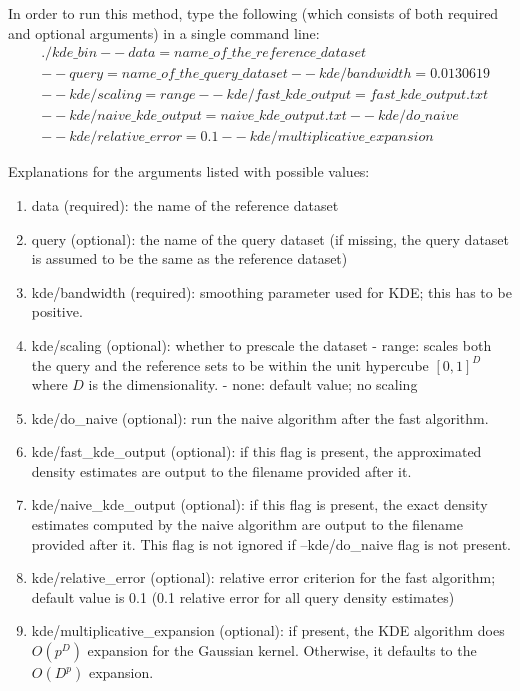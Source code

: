 \documentclass[letter]{report}
\begin{document}
In order to run this method, type the following (which consists of
both required and optional arguments) in a single command line:
\begin{align*}
& \mathit{./kde\_bin} \
\mathit{--data=name\_of\_the\_reference\_dataset}\\ &
\mathit{--query=name\_of\_the\_query\_dataset} \
\mathit{--kde/bandwidth=0.0130619} \\ & \mathit{--kde/scaling=range} \
\mathit{--kde/fast\_kde\_output=fast\_kde\_output.txt}\\ &
\mathit{--kde/naive\_kde\_output=naive\_kde\_output.txt} \
\mathit{--kde/do\_naive}\\ & \mathit{--kde/relative\_error=0.1} \
\mathit{--kde/multiplicative\_expansion}
\end{align*}

Explanations for the arguments listed with possible values:

\begin{enumerate}
\item{data (required): the name of the reference dataset}
\item{query (optional): the name of the query dataset (if missing, the
 query dataset is assumed to be the same as the reference dataset)}
\item{kde/bandwidth (required): smoothing parameter used for KDE; this
 has to be positive.}
\item{kde/scaling (optional): whether to prescale the dataset - range:
scales both the query and the reference sets to be within the unit
hypercube $[0, 1]^D$ where $D$ is the dimensionality.  - none: default
value; no scaling}
\item{kde/do\_naive (optional): run the naive algorithm after the fast
algorithm.}
\item{kde/fast\_kde\_output (optional): if this flag is present, the
approximated density estimates are output to the filename provided
after it.}
\item{kde/naive\_kde\_output (optional): if this flag is present, the
 exact density estimates computed by the naive algorithm are output to
 the filename provided after it. This flag is not ignored if
 --kde/do\_naive flag is not present.}
\item{kde/relative\_error (optional): relative error criterion for the
 fast algorithm; default value is 0.1 (0.1 relative error for all
 query density estimates)}
\item{kde/multiplicative\_expansion (optional): if present, the KDE
algorithm does $O(p^D)$ expansion for the Gaussian kernel. Otherwise,
it defaults to the $O(D^p)$ expansion.}
\end{enumerate}
\end{document}
